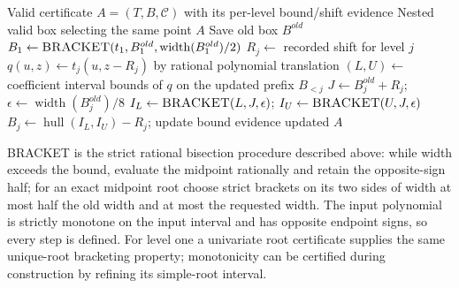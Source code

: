 \documentclass[11pt]{article}
\theoremstyle{definition}
\newcommand{\width}{\operatorname{width}}
\newcommand{\alg}[1]{\textsc{#1}}
\begin{document}
\begin{algorithm}[H]
\caption{NSHR-QQ: explicit rational-data transcription of XZ06 NSHR}\label{a:nshr}
\begin{algorithmic}[1]
\Require Valid certificate $A=(T,B,\mathcal C)$ with its per-level bound/shift evidence
\Ensure Nested valid box selecting the same point
 \State \Return $A$ \EndIf
\State Save old box $B^{old}$
\State $B_1\gets\alg{BRACKET}(t_1,B^{old}_1,\width(B^{old}_1)/2)$
 \State $R_j\gets$ recorded shift for level $j$
 \State $q(u,z)\gets t_j(u,z-R_j)$ by rational polynomial translation
 \State $(L,U)\gets$ coefficient interval bounds of $q$ on the updated prefix $B_{<j}$
 \State $J\gets B^{old}_j+R_j$; $\epsilon\gets\width(B^{old}_j)/8$
 \State $I_L\gets\alg{BRACKET}(L,J,\epsilon)$; $I_U\gets\alg{BRACKET}(U,J,\epsilon)$
 \State $B_j\gets\operatorname{hull}(I_L,I_U)-R_j$; update bound evidence
\EndFor
\State \Return updated $A$
\end{algorithmic}
\end{algorithm}
\alg{BRACKET} is the strict rational bisection procedure described above: while
width exceeds the bound, evaluate the midpoint rationally and retain the
opposite-sign half; for an exact midpoint root choose strict brackets on its two
sides of width at most half the old width and at most the requested width.
The input polynomial is strictly monotone on the input interval and has opposite
endpoint signs, so every step is defined. For level one a univariate root
certificate supplies the same unique-root bracketing property; monotonicity can
be certified during construction by refining its simple-root interval.
\end{document}
